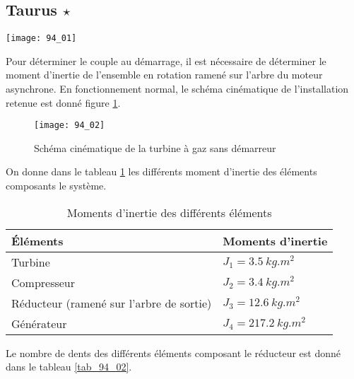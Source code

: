 \normaltrue \difficilefalse \tdifficilefalse
\correctionfalse


\subsection*{Taurus $\star$ \label{C2:06:94}}
\setcounter{question}{0}


\ifcorrection
\else
{}
\fi

\ifprof
\else

\begin{marginfigure}
\texttt{[image: 94\_01]}
\end{marginfigure}
Pour déterminer le couple au démarrage, il est nécessaire de déterminer le moment d’inertie de
 l’ensemble en rotation ramené sur l’arbre du moteur asynchrone.
 En fonctionnement normal, le schéma cinématique de l’installation retenue est donné figure \ref{fig_94_02}.
 

\begin{figure}[!h]
\texttt{[image: 94\_02]}
\caption{Schéma cinématique de la turbine à gaz sans démarreur \label{fig_94_02}}
\end{figure}

On donne dans le tableau \ref{tab_94_01} les différents moment d'inertie des éléments composants le système.


\begin{table}[!h]
\begin{tabular}{ll}
\hline
Éléments & Moments d’inertie \\ \hline
 Turbine 	& $J_1= \SI{3,5}{kg.m^2}$ \\
 Compresseur 	& $J_2=\SI{3,4}{kg.m^2}$\\
 Réducteur (ramené sur l’arbre de sortie)&  $J_3=\SI{12,6}{kg.m^2}$\\
 Générateur 	& $J_4=\SI{217,2}{kg.m^2}$\\
 \hline
\end{tabular}
\caption{Moments d’inertie des différents éléments \label{tab_94_01}}
 \end{table}

 Le nombre de dents des différents éléments composant le réducteur est donné dans le tableau \ref{tab_94_02}.

